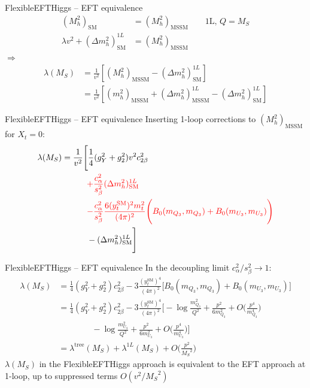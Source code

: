\documentclass[hyperref={pdfpagelabels=false},ngerman]{beamer}
\newcommand{\MS}{\ensuremath{M_S}}
\newcommand{\SM}{\ensuremath{\text{SM}}}
\newcommand{\MSSM}{\ensuremath{\text{MSSM}}}
\begin{document}
\begin{frame}{FlexibleEFTHiggs -- EFT equivalence}
  \begin{align*}
    (M_h^2)_{\SM} &= (M_h^2)_{\MSSM} \qquad \text{1L, } Q = \MS \\
    \lambda v^2 + (\Delta m_h^2)^{1L}_{\SM} &= (M_h^2)_{\MSSM}
  \end{align*}
  $\Rightarrow$
  \begin{align*}
    \lambda(\MS) &= \frac{1}{v^2} \left[ (M_h^2)_{\MSSM} - (\Delta m_h^2)^{1L}_{\SM} \right] \\
    &= \frac{1}{v^2} \left[
      (m_h^2)_{\MSSM} + (\Delta m_h^2)^{1L}_{\MSSM} - (\Delta m_h^2)^{1L}_{\SM}
    \right]
  \end{align*}
\end{frame}

\begin{frame}{FlexibleEFTHiggs -- EFT equivalence}
  Inserting 1-loop corrections to $(M_h^2)_{\MSSM}$ for $X_t = 0$:
  \begin{align*}
    \lambda(\MS) &=
    \frac{1}{v^2} \Bigg[
      \frac{1}{4}(g_Y^2 + g_2^2) v^2 c_{2\beta}^2 \\
      &\quad\qquad \textcolor{red}{ + \frac{c_{\alpha}^2}{s_{\beta}^2} (\Delta m_h^2)^{1L}_{\SM} } \\
      &\quad\qquad \textcolor{red}{ - \frac{c_{\alpha}^2}{s_{\beta}^2} \frac{6 (y_t^{\SM})^2 m_t^2}{(4\pi)^2}
      \Bigg( B_0(m_{Q_3},m_{Q_3}) + B_0(m_{U_3},m_{U_3}) \Bigg) } \\
      &\quad\qquad - (\Delta m_h^2)^{1L}_{\SM}
    \Bigg]
  \end{align*}
\end{frame}

\begin{frame}{FlexibleEFTHiggs -- EFT equivalence}
  In the decoupling limit $c_{\alpha}^2/s_{\beta}^2\rightarrow 1$:
  \begin{align*}
    \lambda(\MS) &=
    \frac{1}{4}(g_Y^2 + g_2^2) c_{2\beta}^2
    - 3 \frac{(y_t^{\SM})^4}{(4\pi)^2} \Bigg[
      B_0(m_{Q_3},m_{Q_3}) + B_0(m_{U_3},m_{U_3})
    \Bigg] \\
    &= \frac{1}{4} (g_Y^2 + g_2^2) c_{2\beta}^2
    - 3 \frac{(y_t^\SM)^4}{(4\pi)^2} \Bigg[ 
    -\log\frac{m^2_{Q_3}}{Q^2} + \frac{p^2}{6m^2_{Q_3}} + O\Big(\frac{p^4}{m^4_{Q_3}}\Big)\\
    &\qquad\qquad
    - \log\frac{m^2_{U_3}}{Q^2} + \frac{p^2}{6m^2_{U_3}} + O\Big(\frac{p^4}{m^4_{U_3}}\Big)
    \Bigg] \\
    &= \lambda^{\text{tree}}(\MS) + \lambda^{1L}(\MS) + O\Big(\frac{p^2}{\MS^2}\Big)
  \end{align*}
  $\lambda(\MS)$ in the FlexibleEFTHiggs approach is equivalent to the
  EFT approach at 1-loop, up to suppressed terms $O(v^2/\MS^2)$
\end{frame}
\end{document}
